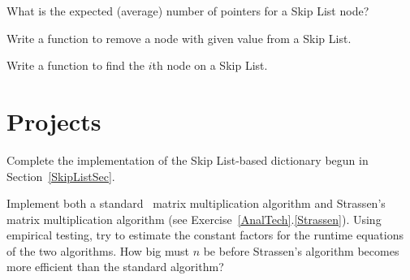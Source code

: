 \begin{exercises}
\item
What is the expected (average) number of pointers for
a Skip List node?

\item
Write a function to remove a node with given value from a
Skip List.

\item
Write a function to find the $i$th node on a
Skip List.

\end{exercises}

\section{Projects}

\begin{projects}

\item
Complete the implementation of the Skip List-based dictionary begun in 
Section~\ref{SkipListSec}.

\item
Implement both a standard \Thetanthree\ matrix multiplication algorithm and
Stras\-sen's matrix multiplication
algorithm
(see Exercise~\ref{AnalTech}.\ref{Strassen}).
Using empirical testing, try to estimate the constant factors for the
runtime equations of the two algorithms.
How big must $n$ be before Strassen's algorithm becomes more efficient
than the standard algorithm?

\end{projects}
